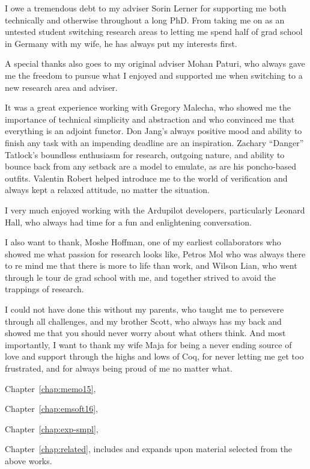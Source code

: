 \documentclass[12pt]{ucsddissertation}
\begin{document}
\begin{acknowledgements}
I owe a tremendous debt to my adviser Sorin Lerner for supporting me both
technically and otherwise throughout a long PhD. From taking me on as an
untested student switching research areas to letting me spend half of grad
school in Germany with my wife, he has always put my interests first.

A special thanks also goes to my original adviser Mohan Paturi, who always
gave me the freedom to pursue what I enjoyed and supported me when
switching to a new research area and adviser.

It was a great experience working with Gregory Malecha, who showed me the
importance of technical simplicity and abstraction and who convinced me
that everything is an adjoint functor. Don Jang's always positive mood and
ability to finish any task with an impending deadline are an inspiration.
Zachary ``Danger'' Tatlock's boundless enthusiasm for research, outgoing
nature, and ability to bounce back from any setback are a model to emulate,
as are his poncho-based outfits. Valentin Robert helped introduce me to the
world of verification and always kept a relaxed attitude, no matter the
situation.

I very much enjoyed working with the Ardupilot developers, particularly
Leonard Hall, who always had time for a fun and enlightening conversation.

I also want to thank, Moshe Hoffman, one of my earliest collaborators who
showed me what passion for research looks like, Petros Mol who was always
there to re mind me that there is more to life than work, and Wilson Lian,
who went through le tour de grad school with me, and together strived to
avoid the trappings of research.

I could not have done this without my parents, who taught me to persevere
through all challenges, and my brother Scott, who always has my back and
showed me that you should never worry about what others think. And most
importantly, I want to thank my wife Maja for being a never ending source
of love and support through the highs and lows of Coq, for never letting me
get too frustrated, and for always being proud of me no matter what.

Chapter~\ref{chap:memo15}, \memoack{}

Chapter~\ref{chap:emsoft16}, \emsoftack{}

Chapter~\ref{chap:exp-smpl}, \expsmplack{}

Chapter~\ref{chap:related}, includes and expands upon material selected
from the above works.
\end{acknowledgements}
\end{document}
